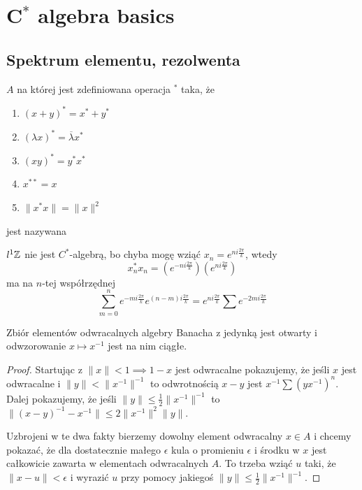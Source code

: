 \section{C${}^*$ algebra basics}

\subsection{Spektrum elementu, rezolwenta}

\begin{definition}{}{}
   $A$ na której jest zdefiniowana operacja ${}^*$ taka, że
  \begin{enumerate}
    \item $(x+y)^*=x^*+y^*$
    \item $(\lambda x)^*=\overline{\lambda}x^*$
    \item $(xy)^*=y^*x^*$
    \item $x^{**}=x$
    \item $\|x^*x\| = \|x\|^2$
  \end{enumerate}
  jest nazywana 
\end{definition}

$l^1\mathbb{Z}$ nie jest $C^*$-algebrą, bo chyba mogę wziąć $x_n=e^{ni\frac{2\pi}{k}}$, wtedy 
$$x_n^*x_n=(e^{-ni\frac{2\pi}{k}})(e^{ni\frac{2\pi}{k}})$$
ma na $n$-tej współrzędnej
$$\sum_{m=0}^n e^{-mi\frac{2\pi}{k}}e^{(n-m)i\frac{2\pi}{k}}=e^{ni\frac{2\pi}{k}}\sum e^{-2mi\frac{2\pi}{k}}$$

\begin{theorem}{}{}
  Zbiór elementów odwracalnych algebry Banacha z jedynką jest otwarty i odwzorowanie $x\mapsto x^{-1}$ jest na nim ciągłe.
\end{theorem}

\begin{proof}
  Startując z $\|x\|<1\implies 1-x$ jest odwracalne pokazujemy, że jeśli $x$ jest odwracalne i $\|y\|<\|x^{-1}\|^{-1}$ to odwrotnością $x-y$ jest $x^{-1}\sum (yx^{-1})^n$. Dalej pokazujemy, że jeśli $\|y\|\leq \frac{1}{2}\|x^{-1}\|^{-1}$ to $\|(x-y)^{-1}-x^{-1}\|\leq 2\|x^{-1}\|^2\|y\|$.

  Uzbrojeni w te dwa fakty bierzemy dowolny element odwracalny $x\in A$ i chcemy pokazać, że dla dostatecznie małego $\epsilon$ kula o promieniu $\epsilon$ i środku w $x$ jest całkowicie zawarta w elementach odwracalnych $A$. To trzeba wziąć $u$ taki, że $\|x-u\|<\epsilon$ i wyrazić $u$ przy pomocy jakiegoś $\|y\|\leq \frac{1}{2}\|x^{-1}\|^{-1}$.
\end{proof}

